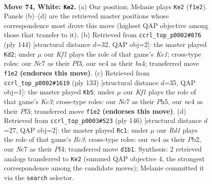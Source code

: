 \documentclass[11pt]{article}
\begin{document}
\clearpage

\begin{figure}[p]\centering
\begin{subfigure}{0.46\textwidth}\centering
\resizebox{\linewidth}{!}{%
\newchessgame
\chessboard[
  setfen={8/PbN5/5k2/8/1pn2PB1/6P1/7P/3R1K2 w - - 16 74},
  showmover=false,
  pgfstyle=straightmove, color=movearrow, markmove={f1-e2}
]}
\caption{}
\end{subfigure}\hfill
\begin{subfigure}{0.46\textwidth}\centering
\resizebox{\linewidth}{!}{%
\newchessgame
\chessboard[
  setfen={8/1p3k2/5p2/6p1/bB2P1P1/5P2/1P6/4K3 w - - 8 73},
  showmover=false,
  pgfstyle=straightmove, color=movearrow, markmove={e1-d2}
]}
\caption{}
\end{subfigure}
\\[4pt]
\begin{subfigure}{0.46\textwidth}\centering
\resizebox{\linewidth}{!}{%
\newchessgame
\chessboard[
  setfen={8/8/p1k5/P6p/3b4/2p2pBN/7P/3K4 b - - 1 67},
  showmover=false,
  pgfstyle=straightmove, color=movearrow, markmove={c6-b5}
]}
\caption{}
\end{subfigure}\hfill
\begin{subfigure}{0.46\textwidth}\centering
\resizebox{\linewidth}{!}{%
\newchessgame
\chessboard[
  setfen={3k4/3b1pn1/6p1/4P3/5P1P/2R2K2/1P6/8 w - - 29 74},
  showmover=false,
  pgfstyle=straightmove, color=movearrow, markmove={c3-c1}
]}
\caption{}
\end{subfigure}
\caption{\textbf{Move 74, White: \texttt{Ke2}.} (a) Our position; Melanie plays \texttt{Ke2} (\texttt{f1e2}). Panels (b)--(d) are the retrieved master positions whose correspondence most drove this move (highest QAP objective among those that transfer to it). (b) Retrieved from \texttt{ccrl\_top\_p0002\#876} (ply 144) [structural distance $d$=32, QAP obj=2]: the master played \texttt{Kd2}; under $\mu$ our \emph{Kf1} plays the role of that game's \emph{Ke1}; cross-type roles: our \emph{N}c7 as their \emph{P}f3, our \emph{n}c4 as their \emph{b}a4; transferred move \texttt{f1e2} \textbf{(endorses this move)}. (c) Retrieved from \texttt{ccrl\_top\_p0002\#1619} (ply 133) [structural distance $d$=35, QAP obj=1]: the master played \texttt{Kb5}; under $\mu$ our \emph{Kf1} plays the role of that game's \emph{Kc3}; cross-type roles: our \emph{N}c7 as their \emph{P}h5, our \emph{n}c4 as their \emph{P}f3; transferred move \texttt{f1e2} \textbf{(endorses this move)}. (d) Retrieved from \texttt{ccrl\_top\_p0003\#523} (ply 146) [structural distance $d$=27, QAP obj=2]: the master played \texttt{Rc1}; under $\mu$ our \emph{Rd1} plays the role of that game's \emph{Rc3}; cross-type roles: our \emph{n}c4 as their \emph{P}b2, our \emph{N}c7 as their \emph{P}f4; transferred move \texttt{d1b1}. Synthesis: 2 retrieved analogs transferred to \texttt{Ke2} (summed QAP objective 4, the strongest correspondence among the candidate moves); Melanie committed it via the \texttt{search} selector.}
\label{fig:thought-m146}
\end{figure}
\end{document}
